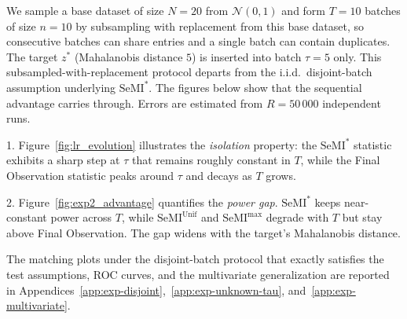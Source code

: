 \documentclass{article}
\theoremstyle{plain}
\theoremstyle{definition}
\theoremstyle{remark}
\newcommand{\cN}{\ensuremath{\mathcal{N}}}
\newcommand{\SeMIstar}{\mathrm{SeMI}^{\ast}}
\newcommand{\SeMIunif}{\mathrm{SeMI}^{\mathrm{Unif}}}
\newcommand{\SeMImax}{\mathrm{SeMI}^{\max}}
\begin{document}
We sample a base dataset of size $N = 20$ from $\cN(0,1)$ and form $T = 10$ batches of size $n = 10$ by subsampling with replacement from this base dataset, so consecutive batches can share entries and a single batch can contain duplicates. The target $z^*$ (Mahalanobis distance $5$) is inserted into batch $\tau = 5$ only. This subsampled-with-replacement protocol departs from the i.i.d.\ disjoint-batch assumption underlying $\SeMIstar$. The figures below show that the sequential advantage carries through. Errors are estimated from $R = 50\,000$ independent runs.

1. Figure~\ref{fig:lr_evolution} illustrates the \emph{isolation} property: the $\SeMIstar$ statistic exhibits a sharp step at $\tau$ that remains roughly constant in $T$, while the Final Observation statistic peaks around $\tau$ and decays as $T$ grows.

2. Figure~\ref{fig:exp2_advantage} quantifies the \emph{power gap}. $\SeMIstar$ keeps near-constant power across $T$, while $\SeMIunif$ and $\SeMImax$ degrade with $T$ but stay above Final Observation. The gap widens with the target's Mahalanobis distance.

The matching plots under the disjoint-batch protocol that exactly satisfies the test assumptions, ROC curves, and the multivariate generalization are reported in Appendices~\ref{app:exp-disjoint},~\ref{app:exp-unknown-tau}, and~\ref{app:exp-multivariate}.
\end{document}
